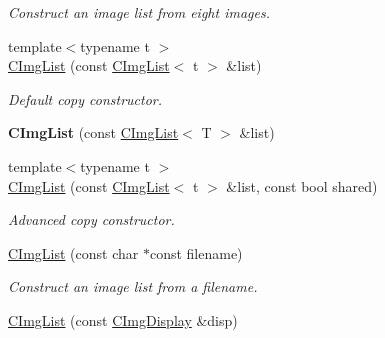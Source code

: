 \begin{DoxyCompactItemize}
\begin{DoxyCompactList}\small\item\em Construct an image list from eight images. \item\end{DoxyCompactList}\item 
\hypertarget{structcimg__library_1_1CImgList_a4c45cdb2fcd20003f727a885879db38f}{
{\footnotesize template$<$typename t $>$ }\\\hyperlink{structcimg__library_1_1CImgList_a4c45cdb2fcd20003f727a885879db38f}{CImgList} (const \hyperlink{structcimg__library_1_1CImgList}{CImgList}$<$ t $>$ \&list)}
\label{structcimg__library_1_1CImgList_a4c45cdb2fcd20003f727a885879db38f}

\begin{DoxyCompactList}\small\item\em Default copy constructor. \item\end{DoxyCompactList}\item 
\hypertarget{structcimg__library_1_1CImgList_a505af5fd1adf73d3429a95bfe6d10f5e}{
{\bfseries CImgList} (const \hyperlink{structcimg__library_1_1CImgList}{CImgList}$<$ T $>$ \&list)}
\label{structcimg__library_1_1CImgList_a505af5fd1adf73d3429a95bfe6d10f5e}

\item 
\hypertarget{structcimg__library_1_1CImgList_a67a22c62beff88afae317fe4ae59aa0e}{
{\footnotesize template$<$typename t $>$ }\\\hyperlink{structcimg__library_1_1CImgList_a67a22c62beff88afae317fe4ae59aa0e}{CImgList} (const \hyperlink{structcimg__library_1_1CImgList}{CImgList}$<$ t $>$ \&list, const bool shared)}
\label{structcimg__library_1_1CImgList_a67a22c62beff88afae317fe4ae59aa0e}

\begin{DoxyCompactList}\small\item\em Advanced copy constructor. \item\end{DoxyCompactList}\item 
\hypertarget{structcimg__library_1_1CImgList_a31c34ce18e197409013e913dbab5a82e}{
\hyperlink{structcimg__library_1_1CImgList_a31c34ce18e197409013e913dbab5a82e}{CImgList} (const char $\ast$const filename)}
\label{structcimg__library_1_1CImgList_a31c34ce18e197409013e913dbab5a82e}

\begin{DoxyCompactList}\small\item\em Construct an image list from a filename. \item\end{DoxyCompactList}\item 
\hypertarget{structcimg__library_1_1CImgList_a964303a171630071ee0c839f4c590ea3}{
\hyperlink{structcimg__library_1_1CImgList_a964303a171630071ee0c839f4c590ea3}{CImgList} (const \hyperlink{structcimg__library_1_1CImgDisplay}{CImgDisplay} \&disp)}
\label{structcimg__library_1_1CImgList_a964303a171630071ee0c839f4c590ea3}


\end{DoxyCompactItemize}
